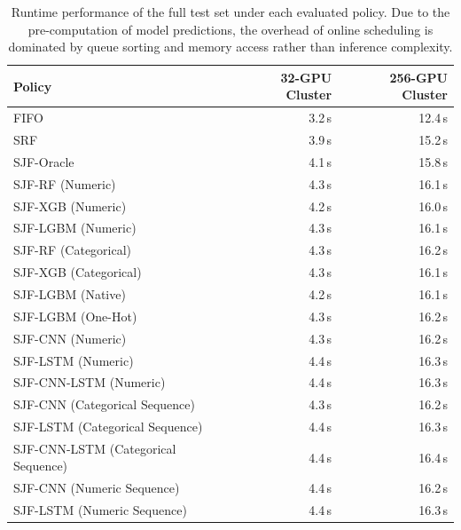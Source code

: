 \begin{table}[htbp]
\centering
\caption[Runtime performance of full test set]{Runtime performance of the full test set under each evaluated policy. Due to the pre-computation of model predictions, the overhead of online scheduling is dominated by queue sorting and memory access rather than inference complexity.}
\label{tab:sim_time}
\begin{tabular}{lrr}
\hline
\textbf{Policy} & \textbf{32-GPU Cluster} & \textbf{256-GPU Cluster} \\
\hline
FIFO & 3.2\,s & 12.4\,s \\
SRF & 3.9\,s & 15.2\,s \\
SJF-Oracle & 4.1\,s & 15.8\,s \\
SJF-RF (Numeric) & 4.3\,s & 16.1\,s \\
SJF-XGB (Numeric) & 4.2\,s & 16.0\,s \\
SJF-LGBM (Numeric) & 4.3\,s & 16.1\,s \\
SJF-RF (Categorical) & 4.3\,s & 16.2\,s \\
SJF-XGB (Categorical) & 4.3\,s & 16.1\,s \\
SJF-LGBM (Native) & 4.2\,s & 16.1\,s \\
SJF-LGBM (One-Hot) & 4.3\,s & 16.2\,s \\
SJF-CNN (Numeric) & 4.3\,s & 16.2\,s \\
SJF-LSTM (Numeric) & 4.4\,s & 16.3\,s \\
SJF-CNN-LSTM (Numeric) & 4.4\,s & 16.3\,s \\
SJF-CNN (Categorical Sequence) & 4.3\,s & 16.2\,s \\
SJF-LSTM (Categorical Sequence) & 4.4\,s & 16.3\,s \\
SJF-CNN-LSTM (Categorical Sequence) & 4.4\,s & 16.4\,s \\
SJF-CNN (Numeric Sequence) & 4.4\,s & 16.2\,s \\
SJF-LSTM (Numeric Sequence) & 4.4\,s & 16.3\,s \\
\hline
\end{tabular}%
\end{table}